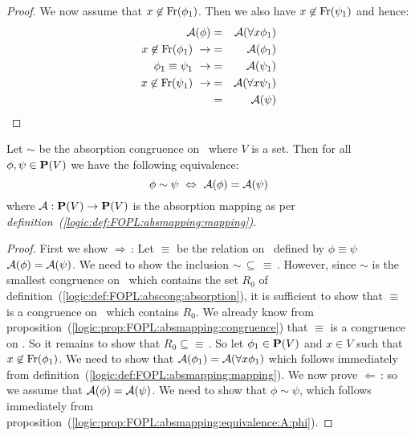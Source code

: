 \begin{proof}
We now assume that $x\not\in\mbox{\rm Fr}(\phi_{1})$. Then we also have
$x\not\in\mbox{\rm Fr}(\psi_{1})$ and hence:
    \begin{eqnarray*}
    {\cal A}(\phi)&=&{\cal A}(\forall x\phi_{1})\\
    x\not\in\mbox{\rm Fr}(\phi_{1})\ \rightarrow
    &=&{\cal A}(\phi_{1})\\
    \phi_{1}\equiv\psi_{1}\ \rightarrow
    &=&{\cal A}(\psi_{1})\\
    x\not\in\mbox{\rm Fr}(\psi_{1})\ \rightarrow
    &=&{\cal A}(\forall x\psi_{1})\\
    &=&{\cal A}(\psi)
    \end{eqnarray*}
\end{proof}

\begin{prop}\label{logic:prop:FOPL:absmapping:kernel}
Let $\sim$ be the absorption congruence on \pv\ where $V$ is a set.
Then for all $\phi,\psi\in\mbox{${\bf P}(V)$}$ we have the following equivalence:
    \[
    \phi\sim\psi\ \Leftrightarrow\ {\cal A}(\phi)={\cal A}(\psi)
    \]
where ${\cal A}:\mbox{${\bf P}(V)$}\to\mbox{${\bf P}(V)$}$ is the absorption mapping as per {\em
definition~(\ref{logic:def:FOPL:absmapping:mapping})}.
\end{prop}
\begin{proof}
First we show $\Rightarrow$\,: Let $\equiv$ be the relation on \pv\
defined by $\phi\equiv\psi$ \ifand\ ${\cal A}(\phi)={\cal A}(\psi)$.
We need to show the inclusion $\sim\,\subseteq\,\equiv\,$. However,
since $\sim$ is the smallest congruence on \pv\ which contains the
set $R_{0}$ of definition~(\ref{logic:def:FOPL:abscong:absorption}),
it is sufficient to show that $\equiv$ is a congruence on \pv\ which
contains $R_{0}$. We already know from
proposition~(\ref{logic:prop:FOPL:absmapping:congruence}) that
$\equiv$ is a congruence on \pv. So it remains to show that
$R_{0}\subseteq\equiv\,$. So let $\phi_{1}\in\mbox{${\bf P}(V)$}$ and $x\in V$ such
that $x\not\in\mbox{\rm Fr}(\phi_{1})$. We need to show that ${\cal
A}(\phi_{1})={\cal A}(\forall x\phi_{1})$ which follows immediately
from definition~(\ref{logic:def:FOPL:absmapping:mapping}). We now
prove $\Leftarrow$\,: so we assume that ${\cal A}(\phi)={\cal
A}(\psi)$. We need to show that $\phi\sim\psi$, which follows
immediately from
proposition~(\ref{logic:prop:FOPL:absmapping:equivalence:A:phi}).
\end{proof}
